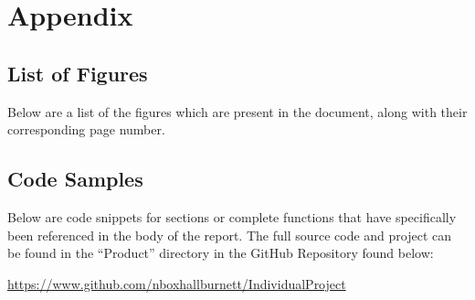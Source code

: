 \setcounter{secnumdepth}{-2}

\chapter{Appendix}
\label{appendix}

\setcounter{chapter}{2}
\renewcommand{\thechapter}{\Alph{chapter}}
\setcounter{secnumdepth}{2}

\renewcommand\thesection{\Alph{section}}

	\begingroup
		\section{List of Figures}
		\label{appendix:figures}

		Below are a list of the figures which are present in the document, along with their corresponding page number.

		\renewcommand{\chapter}[2]{}		%
		\listoffigures						%
	\endgroup

	\section{Code Samples}
	\label{appendix:code}

		Below are code snippets for sections or complete functions that have specifically been referenced in the body of the report.
		The full source code and project can be found in the \enquote{Product} directory in the GitHub Repository found below:

		\url{https://www.github.com/nboxhallburnett/IndividualProject}

